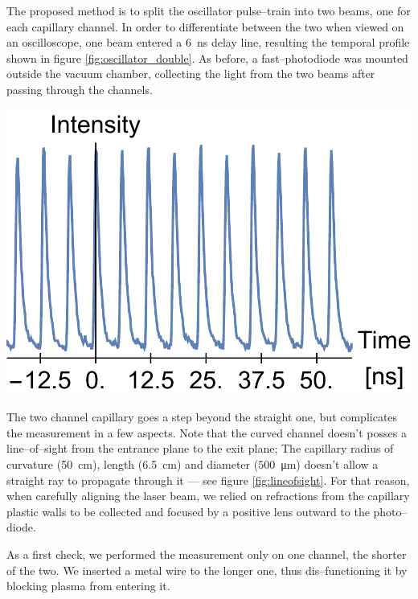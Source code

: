 \documentclass[../main.tex]{subfiles}
\begin{document}
The proposed method is to split the oscillator pulse--train into two beams, one for each capillary channel. In order to differentiate between the two when viewed on an oscilloscope, one beam entered a \SI{6}{\ns} delay line, resulting the temporal profile shown in figure \ref{fig:oscillator_double}. As before, a fast--photodiode was mounted outside the vacuum chamber, collecting the light from the two beams after passing through the channels.
\begin{marginfigure}
\includegraphics[width=\marginparwidth]{figures/oscillator/double.pdf}
\label{fig:oscillator_double}
\caption{Two \SI{84}{\MHz} temporal beam profiles of the oscillator laser, one delayed with respect to the other.}
\end{marginfigure}

The two channel capillary goes a step beyond the straight one, but complicates the measurement in a few aspects. Note that the curved channel doesn't posses a line--of--sight from the entrance plane to the exit plane; The capillary radius of curvature (\SI{50}{\cm}), length (\SI{6.5}{\cm}) and diameter (\SI{500}{\um}) doesn't allow a straight ray to propagate through it --- see figure \ref{fig:lineofsight}. For that reason, when carefully aligning the laser beam, we relied on refractions from the capillary plastic walls to be collected and focused by a positive lens outward to the photo--diode.

As a first check, we performed the measurement only on one channel, the shorter of the two. We inserted a metal wire to the longer one, thus dis--functioning it by blocking plasma from entering it.
\end{document}
